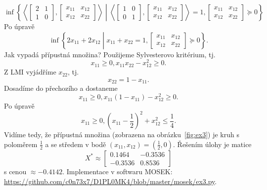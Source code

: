 \begin{pr}
    \begin{equation}\tag{P3}
        \inf \left\{
            \left\langle
            \begin{bmatrix}
                2 & 1 \\
                1 & 0
            \end{bmatrix},
            \begin{bmatrix}
                x_{11} & x_{12} \\
                x_{12} & x_{22}
            \end{bmatrix}
            \right\rangle \middle|
            \left\langle
            \begin{bmatrix}
                1 & 0 \\
                0 & 1
            \end{bmatrix},
            \begin{bmatrix}
                x_{11} & x_{12} \\
                x_{12} & x_{22}
            \end{bmatrix}
            \right\rangle = 1,
            \begin{bmatrix}
                x_{11} & x_{12} \\
                x_{12} & x_{22}
            \end{bmatrix} \succeq 0
        \right\}
        \label{eq:P3}
    \end{equation}
    Po úpravě
    $$
        \inf \left\{
            2 x_{11} + 2 x_{12} \middle| x_{11} + x_{22} = 1, 
            \begin{bmatrix}
                x_{11} & x_{12} \\
                x_{12} & x_{22}
            \end{bmatrix} \succeq 0
        \right\}.
    $$
    Jak vypadá přípustná množina? Použijeme Sylvesterovo kritérium, tj.
    $$
        x_{11} \geq 0, x_{11} x_{22} - x_{12}^2 \geq 0.
    $$
    Z LMI vyjádříme $x_{22}$, tj.
    $$
        x_{22} = 1 - x_{11}.
    $$
    Dosadíme do přechozího a dostaneme
    $$
        x_{11} \geq 0, x_{11} \left(1 - x_{11}\right) - x_{12}^2 \geq 0.
    $$
    Po úpravě
    $$
        x_{11} \geq 0, \left(x_{11} - \frac{1}{2}\right)^2 + x_{12}^2 \leq \frac{1}{4}.
    $$
    Vidíme tedy, že přípustná množina (zobrazena na obrázku~\ref{fig:ex3}) je kruh s poloměrem $\frac{1}{2}$ a se středem v bodě $(x_{11}, x_{12}) = (\frac{1}{2}, 0)$. Řešením úlohy je matice
    $$
        X^* \approx
        \begin{bmatrix}
            0.1464  & -0.3536 \\
            -0.3536 &  0.8536
        \end{bmatrix}
    $$
    s cenou $\approx -0.4142$. Implementace v softwaru MOSEK: \url{https://github.com/c0n73x7/D1PL0MK4/blob/master/mosek/ex3.py}.
\end{pr}

